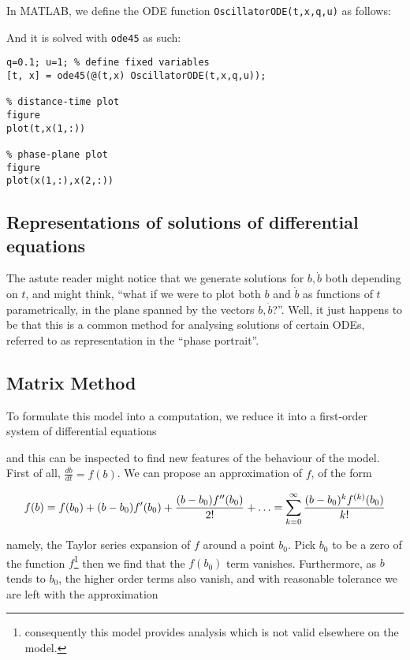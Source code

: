 \documentclass{article}
\begin{document}
In MATLAB, we define the ODE function \texttt{OscillatorODE(t,x,q,u)} as follows:


And it is solved with \texttt{ode45} as such:

\begin{verbatim}
q=0.1; u=1; % define fixed variables
[t, x] = ode45(@(t,x) OscillatorODE(t,x,q,u));

% distance-time plot
figure
plot(t,x(1,:))

% phase-plane plot
figure
plot(x(1,:),x(2,:))
\end{verbatim}

\subsection{Representations of solutions of differential equations}


The astute reader might notice that we generate solutions for $b,\dot{b}$ both depending on $t$,
and might think, ``what if we were to plot both $b$ and $\dot{b}$ as functions of $t$ parametrically,
in the plane spanned by the vectors $b,\dot{b}$?''.
Well, it just happens to be that this is a common method for analysing solutions of certain ODEs,
referred to as representation in the ``phase portrait''. %



\subsection{Matrix Method}

To formulate this model into a computation, we reduce it into a first-order system of differential equations



and this can be inspected to find new features of the behaviour of the model.
First of all, $\frac{d\dot{b}}{dt} = f(b)$.
We can propose an approximation of $f$, of the form

\begin{equation*}
    f(b) = f(b_0) + (b-b_0)f'(b_0) + \frac{(b-b_0)f''(b_0)}{2!} + \mathellipsis = \sum_{k=0}^\infty\frac{(b-b_0)^{k}f^{(k)}(b_0)}{k!}
\end{equation*}

namely, the Taylor series expansion of $f$ around a point $b_0$.
Pick $b_0$ to be a zero of the function $f$\footnote{consequently this model provides analysis which is not valid elsewhere on the model.}
then we find that the $f(b_0)$ term vanishes.
Furthermore, as $b$ tends to $b_0$, the higher order terms also vanish,
and with reasonable tolerance we are left with the approximation
\end{document}
